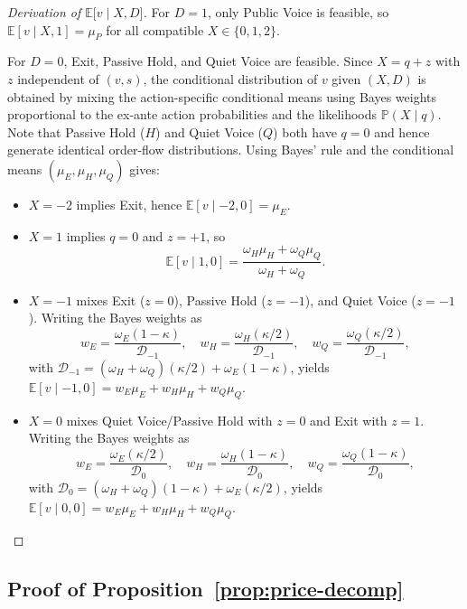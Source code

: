 \documentclass[11pt]{article}
\newcommand{\E}{\mathbb{E}}
\newcommand{\PP}{\mathbb{P}}
\newcommand{\1}{\mathbf{1}}
\begin{document}
\begin{proof}[Derivation of $\E\lbrack v \mid X,D\rbrack$]
For $D=1$, only Public Voice is feasible, so $\E[v \mid X,1]=\mu_P$ for all compatible $X\in\{0,1,2\}$.

For $D=0$, Exit, Passive Hold, and Quiet Voice are feasible. Since $X=q+z$ with $z$ independent of $(v,s)$, the conditional distribution of $v$ given $(X,D)$ is obtained by mixing the action-specific conditional means using Bayes weights proportional to the ex-ante action probabilities and the likelihoods $\PP(X \mid q)$. Note that Passive Hold ($H$) and Quiet Voice ($Q$) both have $q=0$ and hence generate identical order-flow distributions. Using Bayes' rule and the conditional means $(\mu_E,\mu_H,\mu_Q)$ gives:
\begin{itemize}[leftmargin=1.5em,itemsep=0pt]
\item $X=-2$ implies Exit, hence $\E[v \mid -2,0]=\mu_E$.
\item $X=1$ implies $q=0$ and $z=+1$, so
\[
\E[v \mid 1,0] = \frac{\omega_H \mu_H + \omega_Q \mu_Q}{\omega_H + \omega_Q}.
\]
\item $X=-1$ mixes Exit ($z=0$), Passive Hold ($z=-1$), and Quiet Voice ($z=-1$). Writing the Bayes weights as
\[
w_E=\frac{\omega_E(1-\kappa)}{\mathcal{D}_{-1}},\quad
w_H=\frac{\omega_H(\kappa/2)}{\mathcal{D}_{-1}},\quad
w_Q=\frac{\omega_Q(\kappa/2)}{\mathcal{D}_{-1}},
\]
with $\mathcal{D}_{-1}=(\omega_H+\omega_Q)(\kappa/2)+\omega_E(1-\kappa)$, yields $\E[v \mid -1,0]=w_E\mu_E+w_H\mu_H+w_Q\mu_Q$.
\item $X=0$ mixes Quiet Voice/Passive Hold with $z=0$ and Exit with $z=1$. Writing the Bayes weights as
\[
w_E=\frac{\omega_E(\kappa/2)}{\mathcal{D}_0},\quad
w_H=\frac{\omega_H(1-\kappa)}{\mathcal{D}_0},\quad
w_Q=\frac{\omega_Q(1-\kappa)}{\mathcal{D}_0},
\]
with $\mathcal{D}_0=(\omega_H+\omega_Q)(1-\kappa)+\omega_E(\kappa/2)$, yields $\E[v \mid 0,0]=w_E\mu_E+w_H\mu_H+w_Q\mu_Q$.
\end{itemize}
\end{proof}

\subsection{Proof of Proposition~\ref{prop:price-decomp}}
\label{app:proof-price-decomp}
\end{document}
